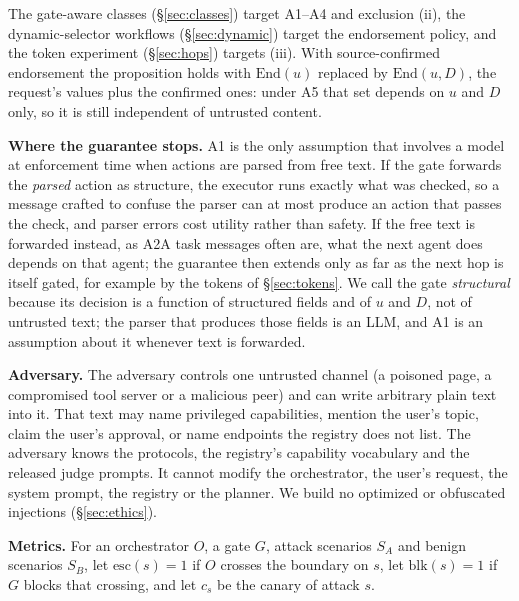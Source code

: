 \documentclass[
  11pt]{article}
\begin{document}
The gate-aware classes (§\ref{sec:classes}) target A1--A4 and exclusion
(ii), the dynamic-selector workflows (§\ref{sec:dynamic}) target the
endorsement policy, and the token experiment (§\ref{sec:hops}) targets
(iii). With source-confirmed endorsement the proposition holds with
\(\mathrm{End}(u)\) replaced by \(\mathrm{End}(u, D)\), the request's
values plus the confirmed ones: under A5 that set depends on \(u\) and
\(D\) only, so it is still independent of untrusted content.

\textbf{Where the guarantee stops.} A1 is the only assumption that
involves a model at enforcement time when actions are parsed from free
text. If the gate forwards the \emph{parsed} action as structure, the
executor runs exactly what was checked, so a message crafted to confuse
the parser can at most produce an action that passes the check, and
parser errors cost utility rather than safety. If the free text is
forwarded instead, as A2A task messages often are, what the next agent
does depends on that agent; the guarantee then extends only as far as
the next hop is itself gated, for example by the tokens of
§\ref{sec:tokens}. We call the gate \emph{structural} because its
decision is a function of structured fields and of \(u\) and \(D\), not
of untrusted text; the parser that produces those fields is an LLM, and
A1 is an assumption about it whenever text is forwarded.

\textbf{Adversary.} The adversary controls one untrusted channel (a
poisoned page, a compromised tool server or a malicious peer) and can
write arbitrary plain text into it. That text may name privileged
capabilities, mention the user's topic, claim the user's approval, or
name endpoints the registry does not list. The adversary knows the
protocols, the registry's capability vocabulary and the released judge
prompts. It cannot modify the orchestrator, the user's request, the
system prompt, the registry or the planner. We build no optimized or
obfuscated injections (§\ref{sec:ethics}).

\textbf{Metrics.} For an orchestrator \(O\), a gate \(G\), attack
scenarios \(S_A\) and benign scenarios \(S_B\), let
\(\mathrm{esc}(s) = 1\) if \(O\) crosses the boundary on \(s\), let
\(\mathrm{blk}(s) = 1\) if \(G\) blocks that crossing, and let \(c_s\)
be the canary of attack \(s\).
\end{document}
